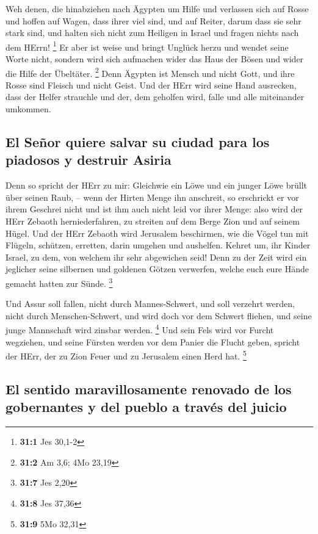  Weh denen, die hinabziehen nach Ägypten um Hilfe und
verlassen sich auf Rosse und hoffen auf Wagen, dass ihrer viel sind, und
auf Reiter, darum dass sie sehr stark sind, und halten sich nicht zum
Heiligen in Israel und fragen nichts nach dem HErrn! \footnote{\textbf{31:1}
  Jes 30,1-2}  Er aber ist weise und bringt Unglück herzu
und wendet seine Worte nicht, sondern wird sich aufmachen wider das Haus
der Bösen und wider die Hilfe der Übeltäter. \footnote{\textbf{31:2} Am
  3,6; 4Mo 23,19}  Denn Ägypten ist Mensch und nicht Gott,
und ihre Rosse sind Fleisch und nicht Geist. Und der HErr wird seine
Hand ausrecken, dass der Helfer strauchle und der, dem geholfen wird,
falle und alle miteinander umkommen.

\hypertarget{el-seuxf1or-quiere-salvar-su-ciudad-para-los-piadosos-y-destruir-asiria}{%
\subsection{El Señor quiere salvar su ciudad para los piadosos y
destruir
Asiria}\label{el-seuxf1or-quiere-salvar-su-ciudad-para-los-piadosos-y-destruir-asiria}}

 Denn so spricht der HErr zu mir: Gleichwie ein Löwe und
ein junger Löwe brüllt über seinen Raub, -- wenn der Hirten Menge ihn
anschreit, so erschrickt er vor ihrem Geschrei nicht und ist ihm auch
nicht leid vor ihrer Menge: also wird der HErr Zebaoth herniederfahren,
zu streiten auf dem Berge Zion und auf seinem Hügel.  Und
der HErr Zebaoth wird Jerusalem beschirmen, wie die Vögel tun mit
Flügeln, schützen, erretten, darin umgehen und aushelfen. 
Kehret um, ihr Kinder Israel, zu dem, von welchem ihr sehr abgewichen
seid!  Denn zu der Zeit wird ein jeglicher seine silbernen
und goldenen Götzen verwerfen, welche euch eure Hände gemacht hatten zur
Sünde. \footnote{\textbf{31:7} Jes 2,20}

 Und Assur soll fallen, nicht durch Mannes-Schwert, und
soll verzehrt werden, nicht durch Menschen-Schwert, und wird doch vor
dem Schwert fliehen, und seine junge Mannschaft wird zinsbar werden.
\footnote{\textbf{31:8} Jes 37,36}  Und sein Fels wird vor
Furcht wegziehen, und seine Fürsten werden vor dem Panier die Flucht
geben, spricht der HErr, der zu Zion Feuer und zu Jerusalem einen Herd
hat. \footnote{\textbf{31:9} 5Mo 32,31}

\hypertarget{el-sentido-maravillosamente-renovado-de-los-gobernantes-y-del-pueblo-a-travuxe9s-del-juicio}{%
\subsection{El sentido maravillosamente renovado de los gobernantes y
del pueblo a través del
juicio}\label{el-sentido-maravillosamente-renovado-de-los-gobernantes-y-del-pueblo-a-travuxe9s-del-juicio}}

